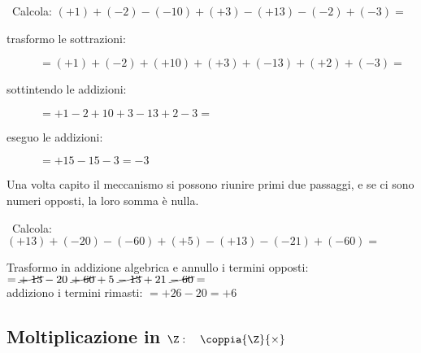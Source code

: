 \begin{esempio}{}{}
~Calcola: \((+1)+(-2)-(-10)+(+3)-(+13)-(-2)+(-3)=\) 
\begin{description}
\item [trasformo le sottrazioni: \quad ] 
\(=(+1)+(-2)+(+10)+(+3)+(-13)+(+2)+(-3)=\)
\item [sottintendo le addizioni: \quad ] \(=+1-2+10+3-13+2-3=\)
\item [eseguo le addizioni: \qquad ~~\, ] \(=+15-15-3=-3\)
\end{description}
\end{esempio}

Una volta capito il meccanismo si possono riunire primi due passaggi, 
e se ci sono numeri opposti, la loro somma è nulla.

\begin{esempio}{}{}
~Calcola: \((+13)+(-20)-(-60)+(+5)-(+13)-(-21)+(-60)=\) 

Trasformo in addizione algebrica e annullo i termini opposti:\\
\(=\cancel{+\;13}-20~\cancel{+\;60}+5~\cancel{-\;13}+21~\cancel{-\;60}=\)\\
addiziono i termini rimasti:\hspace{15.3mm}
\(= +26 - 20 = +6\)
\end{esempio}


\subsection{Moltiplicazione in $\Z: \quad \coppia{\Z}{\times}$}

